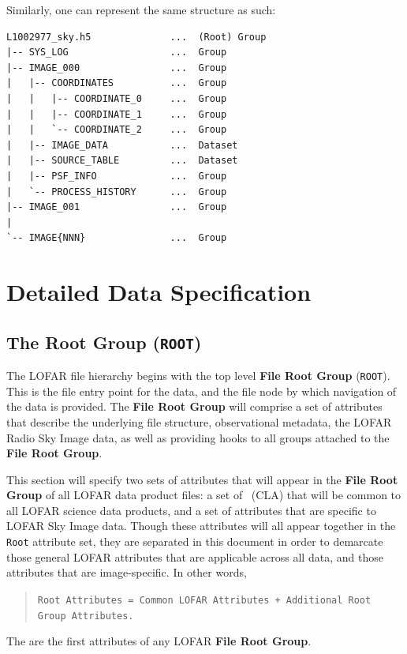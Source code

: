 \documentclass[a4paper,10pt,bibtotoc]{scrartcl}
\begin{document}
Similarly, one can represent the same structure as such:

\begin{lstlisting}
L1002977_sky.h5              ...  (Root) Group
|-- SYS_LOG                  ...  Group
|-- IMAGE_000                ...  Group
|   |-- COORDINATES          ...  Group
|   |   |-- COORDINATE_0     ...  Group
|   |   |-- COORDINATE_1     ...  Group
|   |   `-- COORDINATE_2     ...  Group
|   |-- IMAGE_DATA           ...  Dataset
|   |-- SOURCE_TABLE         ...  Dataset
|   |-- PSF_INFO             ...  Group
|   `-- PROCESS_HISTORY      ...  Group
|-- IMAGE_001                ...  Group
|
`-- IMAGE{NNN}               ...  Group
\end{lstlisting}


\section{Detailed Data Specification}
\label{sec:detailed structure}



\subsection{The Root Group ({\tt ROOT})}
\label{sec:root group}

The LOFAR file hierarchy begins with the top level \textbf{File Root
  Group} (\verb|ROOT|). This is the file entry point for the data, and
the file node by which navigation of the data is provided.  The
\textbf{File Root Group} will comprise a set of attributes that describe
the underlying file structure, observational metadata, the LOFAR Radio Sky Image
data, as well as providing hooks to all groups attached to the
\textbf{File Root Group}.

This section will specify two sets of attributes that will appear in
the \textbf{File Root Group} of all LOFAR data product files: a set of
\cla\ (CLA) that will be common to all LOFAR science
data products, and a set of attributes that are specific to LOFAR Sky
Image data.  Though these attributes will all appear together in the
\texttt{Root} attribute set, they are separated in this document in
order to demarcate those general LOFAR attributes that are applicable
across all data, and those attributes that are image-specific. In
other words,
\begin{verse}
  \verb|Root Attributes = Common LOFAR Attributes + Additional Root Group Attributes.|
\end{verse}
The {\cla} are the first attributes of any LOFAR \textbf{File Root Group}.
\end{document}
